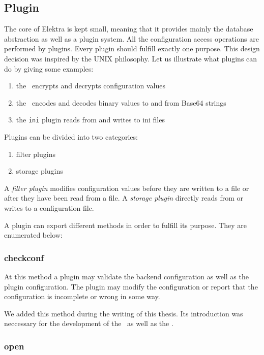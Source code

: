 \subsection{Plugin}\label{impl_elektra_plugin}

The core of Elektra is kept small, meaning that it provides mainly the database abstraction as well as a plugin system.
All the configuration access operations are performed by plugins.\cite{raab2010thesis}
Every plugin should fulfill exactly one purpose.
This design decision was inspired by the UNIX philosophy.
Let us illustrate what plugins can do by giving some examples:
\begin{enumerate}
\item the \crypto ~encrypts and decrypts configuration values
\item the \base ~encodes and decodes binary values to and from Base64 strings
\item the \texttt{ini} plugin reads from and writes to ini files
\end{enumerate}

Plugins can be divided into two categories:
\begin{enumerate}
\item filter plugins
\item storage plugins
\end{enumerate}

A \emph{filter plugin} modifies configuration values before they are written to a file or after they have been read from a file.
A \emph{storage plugin} directly reads from or writes to a configuration file.

A plugin can export different methods in order to fulfill its purpose.
They are enumerated below:

\subsubsection{checkconf}\label{checkconf}

At this method a plugin may validate the backend configuration as well as
the plugin configuration. The plugin may modify the configuration or
report that the configuration is incomplete or wrong in some way.

We added this method during the writing of this thesis.
Its introduction was neccessary for the development of the \crypto ~as well as the \fcrypt.

\subsubsection{open}\label{open}

